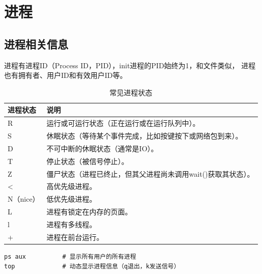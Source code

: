 \section{进程}
\subsection{进程相关信息}
进程有进程ID（Process ID，PID），init进程的PID始终为1，和文件类似，
进程也有拥有者、用户ID和有效用户ID等。
\begin{table}[H]
	\centering
	\begin{tabular}{|l|l|}
		\hline
		\textbf{进程状态} & \textbf{说明}                       \\
		\hline
		R             & 运行或可运行状态（正在运行或在运行队列中）。            \\
		\hline
		S             & 休眠状态（等待某个事件完成，比如按键按下或网络包到来）。      \\
		\hline
		D             & 不可中断的休眠状态（通常是IO）。                 \\
		\hline
		T             & 停止状态（被信号停止）。                      \\
		\hline
		Z             & 僵尸状态（进程已终止，但其父进程尚未调用wait()获取其状态）。 \\
		\hline
		<             & 高优先级进程。                           \\
		\hline
		N（nice）       & 低优先级进程。                           \\
		\hline
		L             & 进程有锁定在内存的页面。                      \\
		\hline
		l             & 进程有多线程。                           \\
		\hline
		+             & 进程在前台运行。                          \\
		\hline
	\end{tabular}
	\caption{常见进程状态}
\end{table}

\begin{code}[title=进程查看]
	\begin{verbatim}
ps aux          # 显示所有用户的所有进程
top             # 动态显示进程信息（q退出，k发送信号）
	\end{verbatim}
\end{code}

